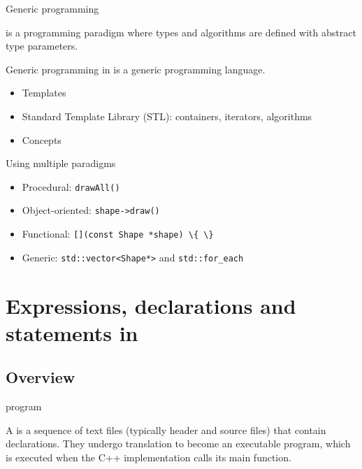 \begin{frame}{Generic programming}{}
  \begin{definition}
     is a programming paradigm where types and algorithms are defined with abstract type parameters.
  \end{definition}
  \begin{block}{Generic programming in \CCLang}
    \CCLang is a generic programming language.
    \begin{itemize}
    \item
      Templates
    \item
      Standard Template Library (STL): containers, iterators, algorithms
    \item
      Concepts
    \end{itemize}
  \end{block}
\end{frame}

\begin{frame}{Using multiple paradigms}{}
  \begin{example}

    \begin{itemize}
    \item
      Procedural: \lstinline!drawAll()!
    \item
      Object-oriented: \lstinline!shape->draw()!
    \item
      Functional: \lstinline![](const Shape *shape) \{ \}!
    \item
      Generic: \lstinline!std::vector<Shape*>! and \lstinline!std::for_each!
    \end{itemize}
  \end{example}
\end{frame}


\section{Expressions, declarations and statements in \CCLang}

\subsection{Overview}

\begin{frame}{\CCLang program}{}
  \begin{definition}
    A  is a sequence of text files (typically header and source files) that contain declarations. They undergo translation to become an executable program, which is executed when the C++ implementation calls its main function.
  \end{definition}
\end{frame}

